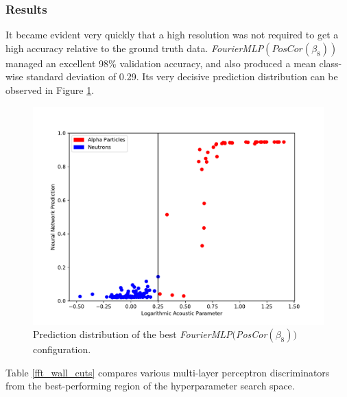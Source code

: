 \documentclass[10pt]{article}
\begin{document}
\subsubsection{Results}

It became evident very quickly that a high resolution was not required to get a high accuracy relative to the ground truth data. {\it FourierMLP}$(PosCor(\beta_{8}))$ managed an excellent 98\% validation accuracy, and also produced a mean class-wise standard deviation of 0.29. Its very decisive prediction distribution can be observed in Figure \ref{banded_no_pos_input_hist}.

\begin{figure}[h]
    \centering
    \includegraphics[width=\textwidth]{banded_no_pos_input_hist}
    \caption{\label{banded_no_pos_input_hist} Prediction distribution of the best {\it FourierMLP}$(${\it PosCor}$(\beta_{8}))$ configuration.}
\end{figure}

Table \ref{fft_wall_cuts} compares various multi-layer perceptron discriminators from the best-performing region of the hyperparameter search space.
\end{document}
